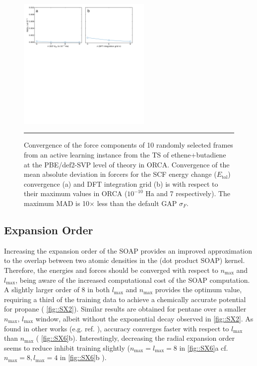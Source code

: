 \documentclass[11pt]{article}
\numberwithin{equation}{subsection}
\begin{document}
\begin{figure}[h!]
	\centering
	\vspace{0.4cm}
	\includegraphics[height=6.4cm]{figSX1.pdf}
	\vspace{0.1cm}
	\hrule
	\vspace{0.1cm}
	\caption{Convergence of the force components of 10 randomly selected frames from an active learning instance from the TS of ethene+butadiene at the PBE/def2-SVP level of theory in ORCA. Convergence of the mean absolute deviation in forcers for the SCF energy change ($E_\text{tol}$) convergence (a) and DFT integration grid (b) is with respect to their maximum values in ORCA ($10^{-10}$ Ha and 7 respectively). The maximum MAD is 10$\times$ less than the default GAP $\sigma_F$.}
	\label{fig::SX1}
\end{figure}


\subsection{Expansion Order}

Increasing the expansion order of the SOAP provides an improved approximation to the overlap between two atomic densities in the (dot product SOAP) kernel. Therefore, the energies and forces should be converged with respect to $n_\text{max}$ and $l_\text{max}$, being aware of the increased computational cost of the SOAP computation. A slightly larger order of 8 in both $l_\text{max}$ and $n_\text{max}$  provides the optimum value, requiring a third of the training data to achieve a chemically accurate potential for propane (\figurename{ \ref{fig::SX2}}). Similar results are obtained for pentane over a smaller $n_\text{max}$, $l_\text{max}$ window, albeit without the exponential decay observed in \figurename{ \ref{fig::SX2}}. As found in other works (e.g. ref. \cite{Rowe2020}), accuracy converges faster with respect to $l_\text{max}$ than $n_\text{max}$ (\figurename{ \ref{fig::SX6}}b). Interestingly, decreasing the radial expansion order seems to reduce inhibit training slightly ($n_\text{max} = l_\text{max} = 8$ in \figurename{ \ref{fig::SX6}a} cf.$n_\text{max} = 8, l_\text{max} = 4$ in \figurename{ \ref{fig::SX6}b} ).
\end{document}

